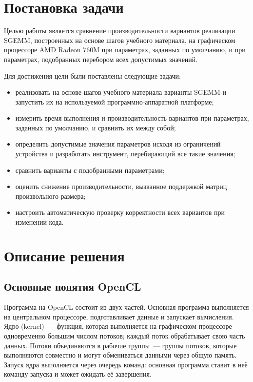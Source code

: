 \documentclass[a4paper]{article}
\begin{document}
\section{Постановка задачи}

Целью работы является сравнение производительности вариантов
реализации SGEMM, построенных на основе шагов учебного материала, на
графическом процессоре AMD Radeon 760M при параметрах, заданных по
умолчанию, и при параметрах, подобранных перебором всех допустимых
значений.

Для достижения цели были поставлены следующие задачи:
\begin{itemize}
    \item реализовать на основе шагов учебного материала варианты SGEMM
    и запустить их на используемой программно-аппаратной платформе;
    \item измерить время выполнения и производительность вариантов при
    параметрах, заданных по умолчанию, и сравнить их между собой;
    \item определить допустимые значения параметров исходя из
    ограничений устройства и разработать инструмент, перебирающий все
    такие значения;
    \item сравнить варианты с подобранными параметрами;
    \item оценить снижение производительности, вызванное поддержкой
    матриц произвольного размера;
    \item настроить автоматическую проверку корректности всех вариантов
    при изменении кода.
\end{itemize}

\section{Описание решения}

\subsection{Основные понятия OpenCL}

Программа на OpenCL состоит из двух частей. Основная программа
выполняется на центральном процессоре, подготавливает данные и
запускает вычисления. Ядро (kernel)~--- функция, которая выполняется
на графическом процессоре одновременно большим числом потоков; каждый
поток обрабатывает свою часть данных. Потоки объединяются в рабочие
группы~--- группы потоков, которые выполняются совместно и могут
обмениваться данными через общую память. Запуск ядра выполняется через
очередь команд: основная программа ставит в неё команду запуска и может
ожидать её завершения.
\end{document}
